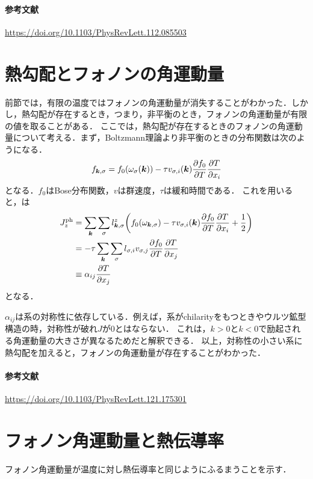 \documentclass{report}
\begin{document}
\paragraph*{参考文献}
\url{https://doi.org/10.1103/PhysRevLett.112.085503}

\section{熱勾配とフォノンの角運動量}
前節では，有限の温度ではフォノンの角運動量が消失することがわかった．しかし，熱勾配が存在するとき，つまり，非平衡のとき，フォノンの角運動量が有限の値を取ることがある．
ここでは，熱勾配が存在するときのフォノンの角運動量について考える．まず，Boltzmann理論より非平衡のときの分布関数は次のようになる．
\begin{align}
  f_{\bm{k},\sigma} = f_0(\omega_\sigma(\bm{k})) - \tau v_{\sigma,i}(\bm{k}) \pdv{f_0}{T}\pdv{T}{x_i} \label{distribution}
\end{align}
となる．$f_0$はBose分布関数，$v$は群速度，$\tau$は緩和時間である．
これを用いると，は
\begin{align}
  J_z^{\mathrm{ph}} &= \sum_{\bm{k}}\sum_{\sigma} l_{\bm{k},\sigma}^z \qty(f_0(\omega_{\bm{k},\sigma}) - \tau v_{\sigma,i}(\bm{k}) \pdv{f_0}{T}\pdv{T}{x_i} + \frac{1}{2}) \\
  &= -\tau \sum_{\bm{k}}\sum_{\sigma} l_{\sigma,i} v_{\sigma,j} \pdv{f_0}{T}\pdv{T}{x_j}\\
  &\equiv \alpha_{ij}\pdv{T}{x_j}
\end{align}
となる．

$\alpha_{ij}$は系の対称性に依存している．例えば，系がchilarityをもつときやウルツ鉱型構造の時，対称性が破れ$J$が0とはならない．
これは，$k>0$と$k<0$で励起される角運動量の大きさが異なるためだと解釈できる．
以上，対称性の小さい系に熱勾配を加えると，フォノンの角運動量が存在することがわかった．

\paragraph*{参考文献}
\url{https://doi.org/10.1103/PhysRevLett.121.175301}

\section{フォノン角運動量と熱伝導率}
フォノン角運動量が温度に対し熱伝導率と同じようにふるまうことを示す．
\end{document}
